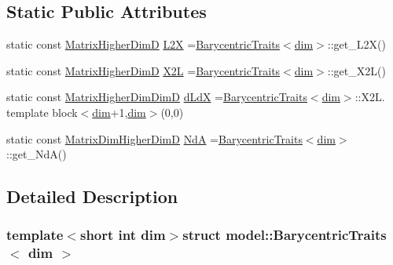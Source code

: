 \subsection*{Static Public Attributes}
\begin{DoxyCompactItemize}
\item 
static const \hyperlink{structmodel_1_1_barycentric_traits_a90e0d5eb84d856af28e250bbb11f2ced}{Matrix\+Higher\+Dim\+D} \hyperlink{structmodel_1_1_barycentric_traits_a727288fed435429e007ae74a250f1027}{L2\+X} =\hyperlink{structmodel_1_1_barycentric_traits}{Barycentric\+Traits}$<$\hyperlink{plot_nd_a_8m_a382f3ca768b275b8d563604f7fc7df73}{dim}$>$\+::get\+\_\+\+L2\+X()
\item 
static const \hyperlink{structmodel_1_1_barycentric_traits_a90e0d5eb84d856af28e250bbb11f2ced}{Matrix\+Higher\+Dim\+D} \hyperlink{structmodel_1_1_barycentric_traits_a9db9e597447070e334d9ed4f2c12902d}{X2\+L} =\hyperlink{structmodel_1_1_barycentric_traits}{Barycentric\+Traits}$<$\hyperlink{plot_nd_a_8m_a382f3ca768b275b8d563604f7fc7df73}{dim}$>$\+::get\+\_\+\+X2\+L()
\item 
static const \hyperlink{structmodel_1_1_barycentric_traits_afe45a5057be0ecbe991df26efe84ce2e}{Matrix\+Higher\+Dim\+Dim\+D} \hyperlink{structmodel_1_1_barycentric_traits_a06b0741d3bc86d30dd13e92250e86fc2}{d\+Ld\+X} =\hyperlink{structmodel_1_1_barycentric_traits}{Barycentric\+Traits}$<$\hyperlink{plot_nd_a_8m_a382f3ca768b275b8d563604f7fc7df73}{dim}$>$\+::X2\+L. template block$<$\hyperlink{plot_nd_a_8m_a382f3ca768b275b8d563604f7fc7df73}{dim}+1,\hyperlink{plot_nd_a_8m_a382f3ca768b275b8d563604f7fc7df73}{dim}$>$(0,0)
\item 
static const \hyperlink{structmodel_1_1_barycentric_traits_a2c6fbdc726cddd2ee8e5e10695aeeb58}{Matrix\+Dim\+Higher\+Dim\+D} \hyperlink{structmodel_1_1_barycentric_traits_acb15b3ea4de71974eed1dc5285b0e5c9}{Nd\+A} =\hyperlink{structmodel_1_1_barycentric_traits}{Barycentric\+Traits}$<$\hyperlink{plot_nd_a_8m_a382f3ca768b275b8d563604f7fc7df73}{dim}$>$\+::get\+\_\+\+Nd\+A()
\end{DoxyCompactItemize}


\subsection{Detailed Description}
\subsubsection*{template$<$short int dim$>$struct model\+::\+Barycentric\+Traits$<$ dim $>$}

